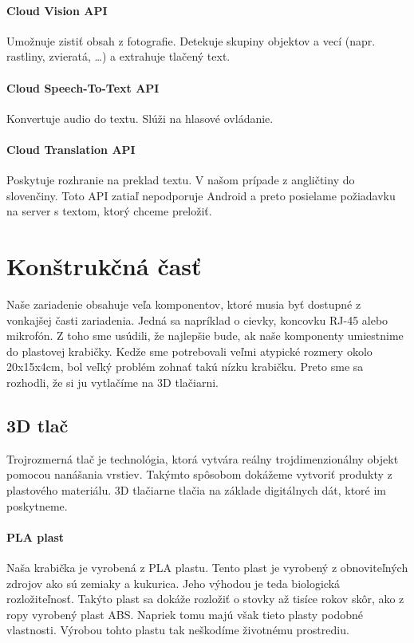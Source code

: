\documentclass{template/socthesis}
\begin{document}
\subsubsection{Cloud Vision API}
Umožnuje zistiť obsah z fotografie. Detekuje skupiny objektov a vecí (napr. rastliny, zvieratá, …) a extrahuje tlačený text.
\subsubsection{Cloud Speech-To-Text API}
Konvertuje audio do textu. Slúži na hlasové ovládanie.
\subsubsection{Cloud Translation API}
Poskytuje rozhranie na preklad textu. V našom prípade z angličtiny do slovenčiny. Toto API zatiaľ nepodporuje Android a preto posielame požiadavku na server s textom, ktorý chceme preložiť.

\chapter{Konštrukčná časť}
Naše zariadenie obsahuje veľa komponentov, ktoré musia byť dostupné z vonkajšej časti zariadenia. Jedná sa napríklad o cievky, koncovku RJ-45 alebo mikrofón. Z toho sme usúdili, že najlepšie bude, ak naše komponenty umiestnime do plastovej krabičky. Kedže sme potrebovali veľmi atypické rozmery okolo 20x15x4cm, bol veľký problém zohnať takú nízku krabičku. Preto sme sa rozhodli, že si ju vytlačíme na 3D tlačiarni. 

\section{3D tlač}
Trojrozmerná tlač je technológia, ktorá vytvára reálny trojdimenzionálny objekt pomocou nanášania vrstiev. Takýmto spôsobom dokážeme vytvoriť produkty z plastového materiálu. 3D tlačiarne tlačia na základe digitálnych dát, ktoré im poskytneme.

\subsubsection{PLA plast}
Naša krabička je vyrobená z PLA plastu. Tento plast je vyrobený z obnoviteľných zdrojov ako sú zemiaky a kukurica. Jeho výhodou je teda biologická rozložiteľnosť. Takýto plast sa dokáže rozložiť o stovky až tisíce rokov skôr, ako z ropy vyrobený plast ABS. Napriek tomu majú však tieto plasty podobné vlastnosti. Výrobou tohto plastu tak neškodíme životnému prostrediu.
\end{document}

